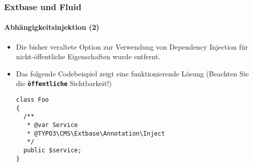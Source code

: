 %

\begin{frame}[fragile]
	\frametitle{Extbase und Fluid}
	\framesubtitle{Abhängigkeitsinjektion (2)}


	\begin{itemize}
		\item Die bisher veraltete Option zur Verwendung von Dependency Injection
			für nicht-öffentliche Eigenschaften wurde entfernt.
		\item Das folgende Codebeispiel zeigt eine funktionierende Lösung\newline
			\small(Beachten Sie die \texttt{\textbf{öffentliche}} Sichtbarkeit!)\normalsize
\begin{lstlisting}
class Foo
{
  /**
   * @var Service
   * @TYPO3\CMS\Extbase\Annotation\Inject
   */
  public $service;
}
\end{lstlisting}

	\end{itemize}

\end{frame}

